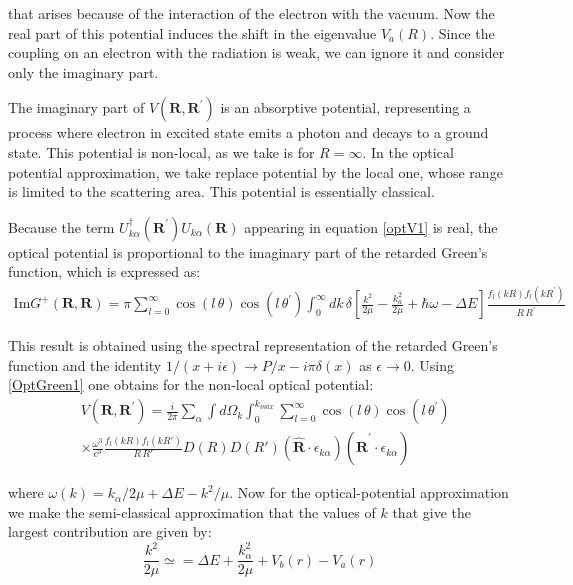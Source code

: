 that arises because of the interaction of the electron with the vacuum. Now the real part of this potential induces the shift in the eigenvalue $ V_a(R) $. Since the coupling on an electron with the radiation is weak, we can ignore it and consider only the imaginary part. 

The imaginary part of $ V(\mathbf{R},\mathbf{R}^{'}) $ is an absorptive potential, representing a process where electron in excited state emits a photon and decays to a ground state. This potential is non-local, as we take is for $ R = \infty $. In the optical potential approximation, we take replace potential by the local one, whose range is limited to the scattering area. This potential is essentially classical.

Because the term $ U_{k\alpha}^{\dagger}(\mathbf{R}^{'})U_{k\alpha}(\mathbf{R}) $ appearing in equation \eqref{optV1} is real, the optical potential is proportional to the imaginary part of the retarded Green's function, which is expressed as:
\begin{equation}\label{OptGreen1}
\begin{split}
\text{Im} G^{+}(\mathbf{R},\mathbf{R}) = \pi\sum_{l=0}^{\infty}{\cos(l\, \theta)\cos(l\,\theta^{'})\int_0^{\infty}{dk\,\delta\left[\frac{k^2}{2\mu} - \frac{k^2_a}{2\mu} + \hbar\omega - \Delta E \right]\frac{f_l(kR)f_l(kR^{'})}{R\,R^{'}} }  }
\end{split}
\end{equation}

This result is obtained using the spectral representation of the retarded Green's function and the identity $ 1/(x + i\epsilon) \rightarrow P/x - i\pi\delta(x) $ as $ \epsilon \rightarrow 0 $. Using \eqref{OptGreen1} one obtains for the non-local optical potential:
\begin{equation}\label{optV2}
\begin{split}
&V(\mathbf{R},\mathbf{R}^{'}) = \frac{i}{2\pi}\sum_{\alpha}\int{d\Omega_k}\int_0^{k_{max}}\sum_{l=0}^{\infty}\cos(l\, \theta)\cos(l\,\theta^{'}) \\[.8em]
&\times\frac{\omega^3}{c^3}\frac{f_l(kR)f_l(kR')}{R\,R'}D(R)D(R')(\hat{\mathbf{R}}\cdot\epsilon_{k\alpha})(\hat{\mathbf{R}}^{'}\cdot\epsilon_{k\alpha})
\end{split}
\end{equation}

where $ \omega(k) = k_{\alpha}/2\mu + \Delta E - k^2/\mu $.  Now for the optical-potential approximation we make the semi-classical approximation that the values of $ k $ that give the largest contribution are given by:
\begin{equation}
\frac{k^2}{2\mu} \simeq = \Delta E + \frac{k_{\alpha}^2}{2\mu} + V_b(r) - V_a(r)
\end{equation}

